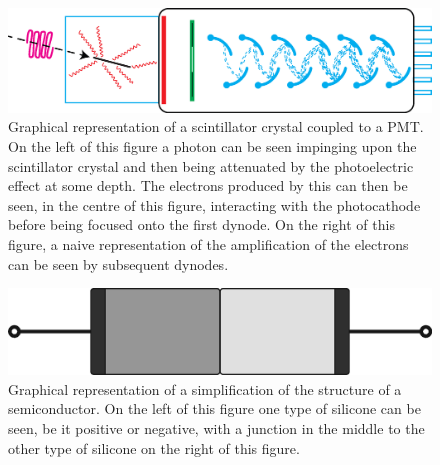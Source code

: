                 \begin{figure}
                    \centering
                    
                    \includegraphics[width=1.0\linewidth]{figures/background_photomultiplier.png}
                    
                    \captionsetup{singlelinecheck=false}
                    \caption{
                        Graphical representation of a scintillator crystal coupled to a \gls{PMT}. On the left of this figure a photon can be seen impinging upon the scintillator crystal and then being attenuated by the photoelectric effect at some depth. The electrons produced by this can then be seen, in the centre of this figure, interacting with the photocathode before being focused onto the first dynode. On the right of this figure, a naive representation of the amplification of the electrons can be seen by subsequent dynodes.
                    }
                    \label{fig:photon_detection_photomultiplier}
                \end{figure}

                \begin{figure}
                    \centering
                    
                    \includegraphics[width=1.0\linewidth]{figures/background_semiconductor.png}
                    
                    \captionsetup{singlelinecheck=false}
                    \caption{
                        Graphical representation of a simplification of the structure of a semiconductor. On the left of this figure one type of silicone can be seen, be it positive or negative, with a junction in the middle to the other type of silicone on the right of this figure.
                    }
                    \label{fig:photon_detection_semiconductor}
                \end{figure}
                
